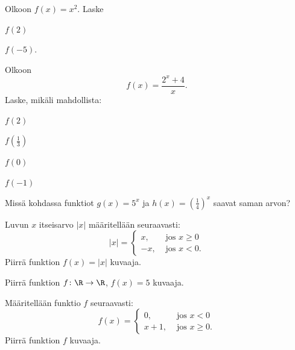 \begin{tehtava}
Olkoon $f(x)=x^2$. Laske
\begin{kohdat}
\item \(f(2)\)
\item \(f(-5).\)
\end{kohdat}
\end{tehtava}

\begin{tehtava}
Olkoon $$f(x)=\frac{2^x+4}{x}.$$ Laske, mikäli mahdollista:
\begin{kohdat}
\item \(f(2)\)
\item \(\displaystyle f\left(\frac{1}{3}\right)\)
\item \(f(0)\)
\item \(f(-1)\)
\end{kohdat}
\end{tehtava}

\begin{tehtava}
Missä kohdassa funktiot $ g(x)=5^{x} $ ja $\displaystyle h(x)=\left(\frac{1}{4}\right)^{x} $ saavat saman arvon?
\end{tehtava}

\begin{tehtava}
Luvun $x$ itseisarvo $|x|$ määritellään seuraavasti:\[|x| =\begin{cases}x, & \text{ jos $x\ge 0$} \\-x, & \text{ jos $x < 0$}.\end{cases}\]Piirrä funktion $f(x)=|x|$ kuvaaja.
\end{tehtava}

\begin{tehtava}
Piirrä funktion \(f\colon\R\to\R\), $f(x)= 5$ kuvaaja.
\end{tehtava}

\begin{tehtava}
Määritellään funktio $f$ seuraavasti:\[f(x) =\begin{cases}0, & \text{ jos } x < 0 \\x+1, & \text{ jos } x \geq 0.\end{cases}\]Piirrä funktion $f$ kuvaaja.
\end{tehtava}

